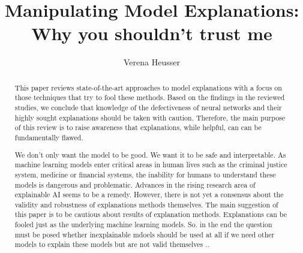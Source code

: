 \documentclass[sigconf]{acmart}
\begin{document}
\title{Manipulating Model Explanations: Why you shouldn't trust me}

\author{Verena Heusser}


\begin{abstract}

  
  This paper reviews state-of-the-art approaches to model explanations with a focus on those techniques that try to 
  fool these methods. Based on the findings in the reviewed studies, we conclude that knowledge of the defectiveness of neural networks and their highly sought explanations should be taken with caution. Therefore, the main purpose of this review is to raise awareness that explanations, while helpful, can can be fundamentally flawed.

  We don't only want the model to be good. We want it to be safe and interpretable. 
  As machine learning models enter critical areas in human lives such as the criminal justice system, medicine or financial systems, the inability for humans to understand these models is dangerous and problematic. Advances in the rising research area of explainable AI seems to be a remedy. However, there is not yet a consensus about the validity and robustness of explanations methods themselves. The main suggestion of this paper is to be cautious about results of explanation methods. Explanations can be fooled just as the underlying machine learning models. So. in the end the question must be posed whether inexplainable mdoels should be used at all if we need other models to explain these models but are not valid themselves .. %

\end{abstract}

\begin{CCSXML}
\end{CCSXML}
\end{document}
